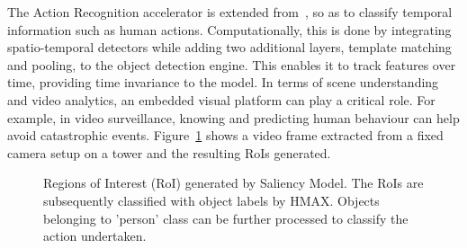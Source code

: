 The Action Recognition accelerator is extended from~\cite{action-recognition}, so as to classify temporal information such as human actions. Computationally, this is done by integrating spatio-temporal detectors while adding two additional layers, template matching and pooling, to the object detection engine. This enables it to track features over time, providing time invariance to the model.
In terms of scene understanding and video analytics, an embedded visual platform can play a critical role. For example, in video surveillance, knowing and predicting human behaviour can help avoid catastrophic events. Figure~\ref{fig:RoIs_campus_000042} shows a video frame extracted from a fixed camera setup on a tower and the resulting RoIs generated.

\begin{figure}[ht!]
\centering
{}
\caption{\label{fig:RoIs_campus_000042} Regions of Interest (RoI) generated by Saliency Model. The RoIs are subsequently classified with object labels by HMAX. Objects belonging to 'person' class can be further processed to classify the action undertaken.}
\end{figure}

